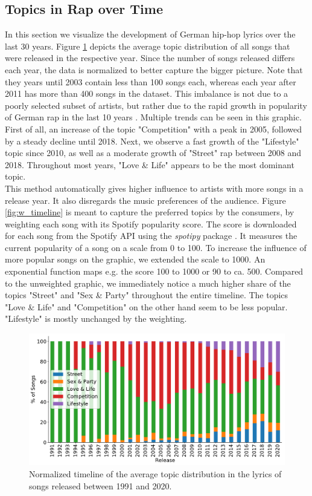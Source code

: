 \documentclass[conference]{IEEEtran}
\begin{document}
\subsection{Topics in Rap over Time}
In this section we visualize the development of German hip-hop lyrics over the last 30 years. Figure \ref{fig:timeline} depicts the average topic distribution of all songs that were released in the respective year. Since the number of songs released differs each year, the data is normalized to better capture the bigger picture. Note that they years until 2003 contain less than 100 songs each, whereas each year after 2011 has more than 400 songs in the dataset. This imbalance is not due to a poorly selected subset of artists, but rather due to the rapid growth in popularity of German rap in the last 10 years \cite{musikindustrie}. Multiple trends can be seen in this graphic. First of all, an increase of the topic "Competition" with a peak in 2005, followed by a steady decline until 2018. Next, we observe a fast growth of the "Lifestyle" topic since 2010, as well as a moderate growth of "Street" rap between 2008 and 2018. Throughout most years, "Love \& Life" appears to be the most dominant topic.\\
This method automatically gives higher influence to artists with more songs in a release year. It also disregards the music preferences of the audience. Figure \ref{fig:w_timeline} is meant to capture the preferred topics by the consumers, by weighting each song with its Spotify popularity score. The score is downloaded for each song from the Spotify API using the \textit{spotipy} package \cite{spotipy}. It measures the current popularity of a song on a scale from 0 to 100. To increase the influence of more popular songs on the graphic, we extended the scale to 1000. An exponential function maps e.g. the score 100 to 1000 or 90 to ca. 500. Compared to the unweighted graphic, we immediately notice a much higher share of the topics "Street" and "Sex \& Party" throughout the entire timeline. The topics "Love \& Life" and "Competition" on the other hand seem to be less popular. "Lifestyle" is mostly unchanged by the weighting.

\begin{figure}[!t]
\includegraphics[width=\linewidth]{figures/timeline.pdf}
\vspace*{-8mm}
\caption{Normalized timeline of the average topic distribution in the lyrics of songs released between 1991 and 2020.}
\label{fig:timeline}
\end{figure}
\end{document}
